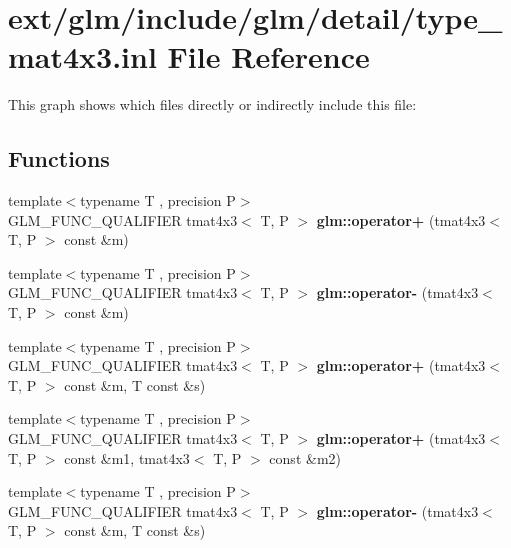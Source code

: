 \hypertarget{type__mat4x3_8inl}{\section{ext/glm/include/glm/detail/type\-\_\-mat4x3.inl File Reference}
\label{type__mat4x3_8inl}
}
This graph shows which files directly or indirectly include this file\-:
\subsection*{Functions}
\begin{DoxyCompactItemize}
\item 
\hypertarget{namespaceglm_a60835fb1a69331ebbee568669fc918a0}{{\footnotesize template$<$typename T , precision P$>$ }\\G\-L\-M\-\_\-\-F\-U\-N\-C\-\_\-\-Q\-U\-A\-L\-I\-F\-I\-E\-R tmat4x3$<$ T, P $>$ {\bfseries glm\-::operator+} (tmat4x3$<$ T, P $>$ const \&m)}\label{namespaceglm_a60835fb1a69331ebbee568669fc918a0}

\item 
\hypertarget{namespaceglm_a60d99cdce91f523e466b9c6fec36a763}{{\footnotesize template$<$typename T , precision P$>$ }\\G\-L\-M\-\_\-\-F\-U\-N\-C\-\_\-\-Q\-U\-A\-L\-I\-F\-I\-E\-R tmat4x3$<$ T, P $>$ {\bfseries glm\-::operator-\/} (tmat4x3$<$ T, P $>$ const \&m)}\label{namespaceglm_a60d99cdce91f523e466b9c6fec36a763}

\item 
\hypertarget{namespaceglm_a876e75ebc71288bb2eef6eb29918f14a}{{\footnotesize template$<$typename T , precision P$>$ }\\G\-L\-M\-\_\-\-F\-U\-N\-C\-\_\-\-Q\-U\-A\-L\-I\-F\-I\-E\-R tmat4x3$<$ T, P $>$ {\bfseries glm\-::operator+} (tmat4x3$<$ T, P $>$ const \&m, T const \&s)}\label{namespaceglm_a876e75ebc71288bb2eef6eb29918f14a}

\item 
\hypertarget{namespaceglm_ac3869c4747532b81543c0bf725251546}{{\footnotesize template$<$typename T , precision P$>$ }\\G\-L\-M\-\_\-\-F\-U\-N\-C\-\_\-\-Q\-U\-A\-L\-I\-F\-I\-E\-R tmat4x3$<$ T, P $>$ {\bfseries glm\-::operator+} (tmat4x3$<$ T, P $>$ const \&m1, tmat4x3$<$ T, P $>$ const \&m2)}\label{namespaceglm_ac3869c4747532b81543c0bf725251546}

\item 
\hypertarget{namespaceglm_afcb0d386fe4230e7be47ef8bc7eac70b}{{\footnotesize template$<$typename T , precision P$>$ }\\G\-L\-M\-\_\-\-F\-U\-N\-C\-\_\-\-Q\-U\-A\-L\-I\-F\-I\-E\-R tmat4x3$<$ T, P $>$ {\bfseries glm\-::operator-\/} (tmat4x3$<$ T, P $>$ const \&m, T const \&s)}\label{namespaceglm_afcb0d386fe4230e7be47ef8bc7eac70b}


\end{DoxyCompactItemize}
